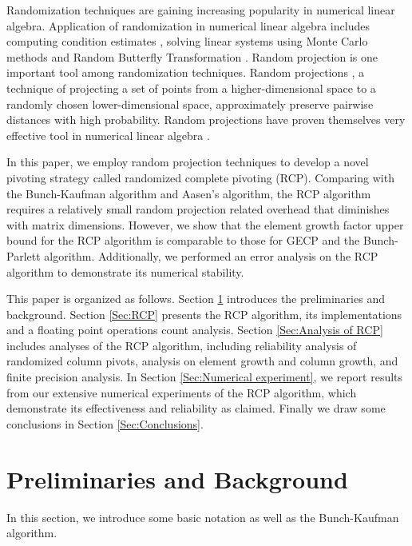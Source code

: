 \documentclass[11pt]{article}
\begin{document}
Randomization techniques are gaining increasing popularity in numerical linear algebra. Application of randomization in numerical linear algebra includes computing condition estimates \cite{arioli2007partial,kenney1998statistical}, solving linear systems using Monte Carlo methods \cite{dimov2008monte} and Random Butterfly Transformation \cite{baboulin2014efficient, baboulin2013accelerating,baboulin2015dense,parker1995random}. Random projection is one important tool among randomization techniques. Random projections \cite{arriaga1999algorithmic, vempala2005random}, a technique of projecting a set of points from a higher-dimensional space to a randomly chosen lower-dimensional space, approximately preserve pairwise distances \cite{johnson1984extensions} with high probability. Random projections have proven themselves very effective tool in numerical linear algebra \cite{gu2015subspace,halko2011finding, mahoney2011randomized,martinsson2011randomized,   melgaard2015gaussian,woolfe2008fast,xiao2016spectrum}. 

In this paper, we employ random projection techniques to develop a novel pivoting strategy called randomized complete pivoting (RCP). Comparing with the Bunch-Kaufman algorithm and Aasen's algorithm, the RCP algorithm requires a relatively small random projection related overhead that diminishes with matrix dimensions. However, we show that the element growth factor upper bound for the RCP algorithm is comparable to those for GECP and the Bunch-Parlett algorithm. Additionally, we performed an error analysis on the RCP algorithm to demonstrate its numerical stability. 

This paper is organized as follows. Section \ref{Sec:Preliminaries and Background} introduces the preliminaries and background. Section \ref{Sec:RCP} presents the RCP algorithm, its implementations and a floating point operations count analysis. Section \ref{Sec:Analysis of RCP} includes analyses of the RCP algorithm, including reliability analysis of randomized column pivots, analysis on element growth and column growth, and finite precision analysis. In Section \ref{Sec:Numerical experiment}, we report results from our extensive numerical experiments of the RCP algorithm, which demonstrate its effectiveness and reliability as claimed. Finally we draw some conclusions in Section \ref{Sec:Conclusions}. 

\section{Preliminaries and Background} \label{Sec:Preliminaries and Background}
In this section, we introduce some basic notation as well as the Bunch-Kaufman algorithm. 
\end{document}
